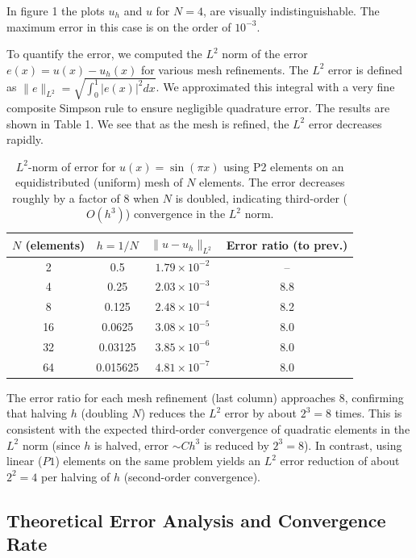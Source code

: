 \documentclass[a4paper,10pt]{article}
\begin{document}
In figure 1 the plots $u_h$ and $u$ for $N=4$, are visually indistinguishable. 
The maximum error in this case is on the order of $10^{-3}$.

To quantify the error, we computed the $L^2$ norm of the error $e(x)=u(x)-u_h(x)$ for various mesh refinements. The $L^2$ error is defined as $\|e\|_{L^2} = \sqrt{\int_0^1 |e(x)|^2 dx}$. We approximated this integral with a very fine composite Simpson rule to ensure negligible quadrature error. The results are shown in Table 1. We see that as the mesh is refined, the $L^2$ error decreases rapidly.

\begin{table}[h]
\centering
\begin{tabular}{|c|c|c|c|}
\hline
$N$ (elements) & $h=1/N$ & $\|u - u_h\|_{L^2}$ & Error ratio (to prev.) \\
\hline
2 & 0.5 & $1.79\times 10^{-2}$ & -- \\
4 & 0.25 & $2.03\times 10^{-3}$ & 8.8 \\
8 & 0.125 & $2.48\times 10^{-4}$ & 8.2 \\
16 & 0.0625 & $3.08\times 10^{-5}$ & 8.0 \\
32 & 0.03125 & $3.85\times 10^{-6}$ & 8.0 \\
64 & 0.015625 & $4.81\times 10^{-7}$ & 8.0 \\
\hline
\end{tabular}
\caption{$L^2$-norm of error for $u(x)=\sin(\pi x)$ using P2 elements on an equidistributed (uniform) mesh of $N$ elements. The error decreases roughly by a factor of 8 when $N$ is doubled, indicating third-order ($O(h^3)$) convergence in the $L^2$ norm.}
\label{tab:convergence}
\end{table}

The error ratio for each mesh refinement (last column) approaches 8, confirming that halving $h$ (doubling $N$) reduces the $L^2$ error by about $2^3=8$ times. 
This is consistent with the expected third-order convergence of quadratic elements in the $L^2$ norm (since $h$ is halved, error $\sim Ch^3$ is reduced by $2^3=8$). 
In contrast, using linear ($P1$) elements on the same problem yields an $L^2$ error reduction of about $2^2=4$ per halving of $h$ (second-order convergence).

\subsection{Theoretical Error Analysis and Convergence Rate}
\end{document}
